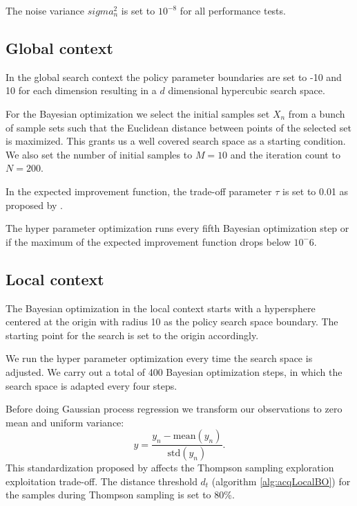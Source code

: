 The noise variance $sigma_n^2$ is set to $10^{-8}$ for all performance tests.

\subsection{Global context}

In the global search context the policy parameter boundaries are set to -10 and 10 for each dimension resulting in a $d$ dimensional hypercubic search space.

For the Bayesian optimization we select the initial samples set $X_n$ from a bunch of sample sets such that the Euclidean distance between points of the selected set is maximized. This grants us a well covered search space as a starting condition. We also set the number of initial samples to $M = 10$ and the iteration count to $N = 200$.

In the expected improvement function, the trade-off parameter $\tau$ is set to 0.01 as proposed by \cite{brochu2010tutorial}.

The hyper parameter optimization runs every fifth Bayesian optimization step or if the maximum of the expected improvement function drops below $10^-6$.

\subsection{Local context}
The Bayesian optimization in the local context starts with a hypersphere centered at the origin with radius 10 as the policy search space boundary. The starting point for the search is set to the origin accordingly.

We run the hyper parameter optimization every time the search space is adjusted. We carry out a total of 400 Bayesian optimization steps, in which the search space is adapted every four steps.

Before doing Gaussian process regression we transform our observations to zero mean and uniform variance:
$$y = \frac{y_{n}-\mathrm{mean}(y_{n})}{\mathrm{std}(y_{n})}.$$
This standardization proposed by \cite{akrour2017local} affects the Thompson sampling exploration exploitation trade-off. The distance threshold $d_t$ (algorithm \ref{alg:acqLocalBO}) for the samples during Thompson sampling is set to 80\%.
